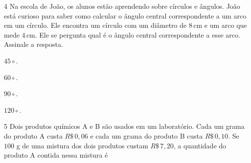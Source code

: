 
\num{4} Na escola de João, os alunos estão aprendendo sobre círculos e
ângulos. João está curioso para saber como calcular o ângulo central
correspondente a um arco em um círculo. Ele encontra um círculo com um
diâmetro de $8\,\text{cm}$ e um arco que mede $4\,\text{cm}$. Ele se
pergunta qual é o ângulo central correspondente a esse arco. Assinale
a resposta.

\begin{escolha}
\item $45\circ$.

\item $60\circ$.

\item $90\circ$.

\item $120\circ$.
\end{escolha}



\num{5}  Dois produtos químicos A e B são usados em um laboratório. Cada um grama do
produto A custa $R\$\,0,06$ e cada um grama do produto B custa
$R\$\,0,10$. Se $100$ g de uma mistura dos dois produtos custam $R\$\,7,20$, a
quantidade do produto A contida nessa mistura é

